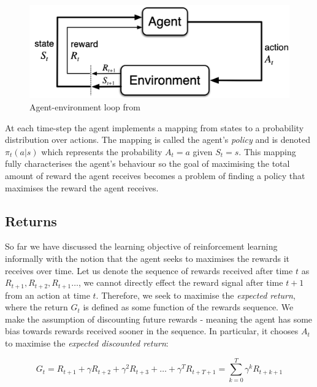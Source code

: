\documentclass{article}
\begin{document}
\

\begin{figure}
	\centering
	\includegraphics[scale=0.6]{images/agent_environment.png}
	\caption{Agent-environment loop from \citet{sutton2018reinforcement}}
	\label{fig:agent_environment}
\end{figure}

At each time-step the agent implements a mapping from states to a probability distribution over actions. The mapping is called the agent's \textit{policy} and is denoted $\pi_t(a | s)$ which represents the probability $A_t = a$ given $S_t = s$. This mapping fully characterises the agent's behaviour \citep{silver2015rl} so the goal of maximising the total amount of reward the agent receives becomes a problem of finding a policy that maximises the reward the agent receives. 

\subsection{Returns}

So far we have discussed the learning objective of reinforcement learning informally with the notion that the agent seeks to maximises the rewards it receives over time. Let us denote the sequence of rewards received after time $t$ as $R_{t+1}, R_{t+2}, R_{t+1} \hdots$, we cannot directly effect the reward signal after time $t+1$ from an action at time $t$. Therefore, we seek to maximise the \textit{expected return}, where the return $G_t$ is defined as some function of the rewards sequence. We make the assumption of discounting future rewards - meaning the agent has some bias towards rewards received sooner in the sequence. In particular, it chooses $A_t$ to maximise the \textit{expected discounted return}:

\begin{equation}\label{eq:returns}
	G_t = R_{t+1} + \gamma R_{t+2}+ \gamma^2 R_{t+3} + \hdots + \gamma^{T} R_{t+T+1} = \sum_{k=0}^T \gamma^k R_{t + k + 1}
\end{equation}
\end{document}
